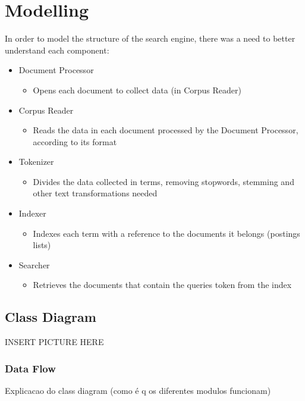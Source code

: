 \documentclass[11pt,a4paper]{report}
\begin{document}
\vspace{2cm}
{\let\clearpage\relax \chapter{Modelling}}
In order to model the structure of the search engine, there was a need to better understand each component:
\begin{itemize}
\item Document Processor
\begin{itemize}
\item[\textperiodcentered]Opens each document to collect data (in Corpus Reader)
\end{itemize}
\item Corpus Reader
\begin{itemize}
\item[\textperiodcentered]Reads the data in each document processed by the Document Processor, according to its format
\end{itemize}
\item Tokenizer
\begin{itemize}
\item[\textperiodcentered]Divides the data collected in terms, removing stopwords, stemming and other text transformations needed
\end{itemize}
\item Indexer
\begin{itemize}
\item[\textperiodcentered]Indexes each term with a reference to the documents it belongs (postings lists)
\end{itemize}
\item Searcher
\begin{itemize}
\item[\textperiodcentered]Retrieves the documents that contain the queries token from the index
\end{itemize}
\end{itemize}
\pagebreak
\section{Class Diagram}
INSERT PICTURE HERE
\subsection{Data Flow}
Explicacao do class diagram (como é q os diferentes modulos funcionam)
\end{document}

